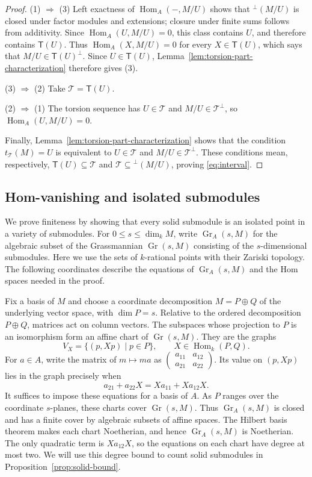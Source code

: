 \documentclass[a4paper,reqno,10pt]{amsart}
\theoremstyle{definition}
\numberwithin{equation}{section}
\newcommand{\kfield}{k}
\newcommand{\Hom}{\operatorname{Hom}}
\newcommand{\Gr}{\operatorname{Gr}}
\newcommand{\T}{\mathcal T}
\newcommand{\Tgen}{\mathsf T}
\begin{document}
\begin{proof}
(1) $\Rightarrow$ (3)
Left exactness of $\Hom_A(-,M/U)$ shows that ${}^\perp(M/U)$ is
closed under factor modules and extensions; closure under finite sums
follows from additivity. Since
$\Hom_A(U,M/U)=0$, this class contains $U$, and therefore contains
$\Tgen(U)$. Thus $\Hom_A(X,M/U)=0$ for every $X\in\Tgen(U)$,
which says that $M/U\in\Tgen(U)^\perp$. Since $U\in\Tgen(U)$,
Lemma~\ref{lem:torsion-part-characterization}
therefore gives (3).

(3) $\Rightarrow$ (2) Take $\T=\Tgen(U)$.

(2) $\Rightarrow$ (1)
The torsion sequence has $U\in\T$ and $M/U\in\T^\perp$, so
$\Hom_A(U,M/U)=0$.

Finally, Lemma~\ref{lem:torsion-part-characterization} shows that the
condition $t_\T(M)=U$ is equivalent to $U\in\T$ and
$M/U\in\T^\perp$. These conditions mean, respectively,
$\Tgen(U)\subseteq\T$ and $\T\subseteq{}^\perp(M/U)$, proving
\eqref{eq:interval}.
\end{proof}

\subsection{Hom-vanishing and isolated submodules}

We prove finiteness by showing that every solid submodule is an isolated
point in a variety of submodules. For
$0\leq s\leq\dim_\kfield M$, write $\Gr_A(s,M)$ for the algebraic subset of the
Grassmannian $\Gr(s,M)$ consisting of the $s$-dimensional submodules.
Here we use the sets of $k$-rational points with their Zariski topology.
The following coordinates describe the equations of $\Gr_A(s,M)$ and
the Hom spaces needed in the proof.

Fix a basis of $M$ and choose a coordinate decomposition $M=P\oplus Q$
of the underlying vector space, with $\dim P=s$. Relative to the ordered
decomposition $P\oplus Q$, matrices act on column vectors.
The subspaces whose projection to $P$ is an isomorphism form an affine
chart of $\Gr(s,M)$. They are the graphs
\[
 V_X=\{(p,Xp)\mid p\in P\},\qquad X\in\Hom_\kfield(P,Q).
\]
For $a\in A$, write the matrix of $m\mapsto ma$ as
$\left(\begin{smallmatrix}a_{11}&a_{12}\\a_{21}&a_{22}\end{smallmatrix}\right)$.
Its value on $(p,Xp)$ lies in the graph precisely when
\begin{equation}\label{eq:graph-invariance}
 a_{21}+a_{22}X=Xa_{11}+Xa_{12}X.
\end{equation}
It suffices to impose these equations for a basis of $A$. As $P$ ranges
over the coordinate $s$-planes, these charts cover $\Gr(s,M)$. Thus
$\Gr_A(s,M)$ is closed and has a finite cover by algebraic subsets of
affine spaces. The Hilbert basis theorem makes each chart Noetherian,
and hence $\Gr_A(s,M)$ is Noetherian.
The only quadratic term is $Xa_{12}X$, so the equations on each chart
have degree at most two. We will use this degree bound to count solid
submodules in Proposition~\ref{prop:solid-bound}.
\end{document}
